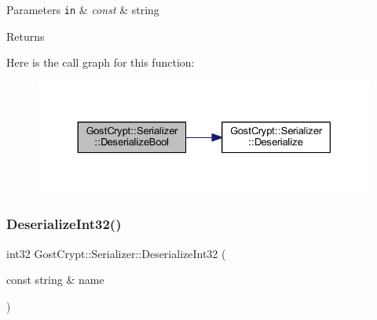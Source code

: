 \begin{DoxyParams}[1]{Parameters}
\mbox{\tt in}  & {\em const} & string \\
\hline
\end{DoxyParams}
\begin{DoxyReturn}{Returns}

\end{DoxyReturn}
Here is the call graph for this function\+:
\nopagebreak
\begin{figure}[H]
\begin{center}
\leavevmode
\includegraphics[width=330pt]{class_gost_crypt_1_1_serializer_af393b082b53d0e44b2f53be8e02f68ba_cgraph}
\end{center}
\end{figure}
\mbox{\label{class_gost_crypt_1_1_serializer_a5fb6eca3b3bbee7d5cb540a02b156ca9}} 
\subsubsection{\texorpdfstring{Deserialize\+Int32()}{DeserializeInt32()}}
{\footnotesize\ttfamily int32 Gost\+Crypt\+::\+Serializer\+::\+Deserialize\+Int32 (\begin{DoxyParamCaption}\item[{const string \&}]{name }\end{DoxyParamCaption})}


